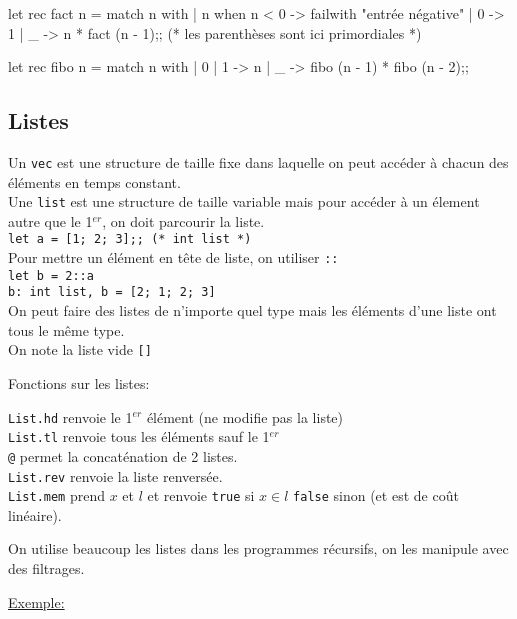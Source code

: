 \documentclass{article}
\newcommand{\code}[1]{\lstinline[style = mystyle]{#1}}
\begin{document}
				\begin{case}
let rec fact n = match n with
| n when n < 0 -> failwith "entrée négative"
| 0 -> 1
| _ -> n * fact (n - 1);; (* les parenthèses sont ici primordiales *)

let rec fibo n = match n with
| 0 | 1 -> n
| _ -> fibo (n - 1) * fibo (n - 2);;
				\end{case}
			
		\subsection{Listes}
		
			Un \code{vec} est une structure de taille fixe dans laquelle on peut accéder à chacun des éléments en temps constant.\\
			Une \code{list} est une structure de taille variable mais pour accéder à un élement autre que le 1$^{er}$, on doit parcourir la liste.\\
			\code{let a = [1; 2; 3];; (* int list *)}\\
			Pour mettre un élément en tête de liste, on utiliser \code{::}\\
			\code{let b = 2::a}\\
			\code{b: int list, b = [2; 1; 2; 3]}\\
			On peut faire des listes de n'importe quel type mais les éléments d'une liste ont tous le même type.\\
			On note la liste vide \code{[]}
			
			Fonctions sur les listes:
			
			\code{List.hd} renvoie le 1$^{er}$ élément (ne modifie pas la liste)\\
			\code{List.tl} renvoie tous les éléments sauf le 1$^{er}$\\
			\code{@} permet la concaténation de 2 listes.\\
			\code{List.rev} renvoie la liste renversée.\\
			\code{List.mem} prend $x$ et $l$ et renvoie \code{true} si $x \in l$ \code{false} sinon (et est de coût linéaire).
			
			On utilise beaucoup les listes dans les programmes récursifs, on les manipule avec des filtrages.
			
			\underline{Exemple:}
			
			
\end{document}
